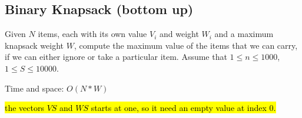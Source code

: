 \subsection{Binary Knapsack (bottom up)}

Given $N$ items, each with its own value $V_i$ and weight $W_i$ and a maximum knapsack weight $W$, compute the maximum value of the items that we can carry, if we can either ignore or take a particular item. Assume that $1 \leq n \leq 1000$, $1 \leq S \leq 10 000$.

Time and space: $O(N*W)$

\hl{the vectors $VS$ and $WS$ starts at one, so it need an empty value at index 0.}
